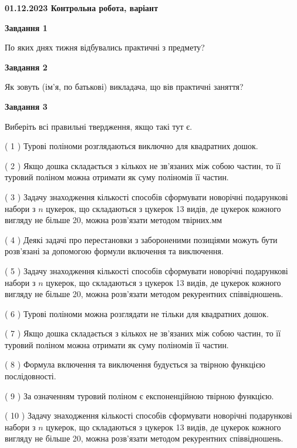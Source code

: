 \documentclass[12pt, ukrainian]{article}
\begin{document}
\begin {large}

\textbf{01.12.2023 Контрольна робота, варіант  }\par


{
{\begin {center}\textbf{Завдання 1}\end {center}}\par
По яких днях тижня відбувались практичні з предмету?\par
{\begin {center}\textbf{Завдання 2}\end {center}}\par
Як зовуть (ім'я, по батькові) викладача, що вів практичні заняття?\par
{\begin {center}\textbf{Завдання 3}\end {center}}\par
Виберіть всі правильні твердження, якщо такі тут є.\par
\vspace{2mm}
( 1 ) Турові поліноми розглядаються виключно для квадратних дошок.%

( 2 ) Якщо дошка складається з кількох не зв’язаних між собою частин, то її туровий поліном можна отримати як суму поліномів її частин.%

( 3 ) Задачу знаходження кількості способів сформувати новорічні подарункові набори з $n$ цукерок, що складаються з цукерок 13 видів, де цукерок кожного вигляду не більше 20, можна розв’язати методом твірних.мм%

( 4 ) Деякі задачі про перестановки з забороненими позиціями можуть бути розв’я\-за\-ні за допомогою формули включення та виключення.%

( 5 ) Задачу знаходження кількості способів сформувати новорічні подарункові набори з $n$ цукерок, що складаються з цукерок 13 видів, де цукерок кожного вигляду не більше 20, можна розв’язати методом рекурентних співвідношень.%

( 6 ) Турові поліноми можна розглядати не тільки для квадратних дошок.%

( 7 ) Якщо дошка складається з кількох не зв’язаних між собою частин, то її туровий поліном можна отримати як суму поліномів її частин.%

( 8 ) Формула включення та виключення будується за твірною функцією послідовності.%

( 9 ) За означенням туровий поліном є експоненційною твірною функцією.%

( 10 ) Задачу знаходження кількості способів сформувати новорічні подарункові набори з $n$ цукерок, що складаються з цукерок 13 видів, де цукерок кожного вигляду не більше 20, можна розв’язати методом рекурентних співвідношень.%
}
\end {large}

\vspace{4mm}
\newpage
\end{document}
